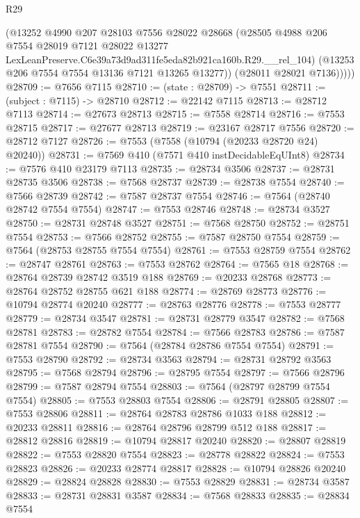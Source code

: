 \begin{lexlean}{R29}
\begin{coremodule}
            (@13252
              @4990
              @207
              @28103
              @7556
              @28022
              @28668
              (@28505
                @4988
                @206
                @7554
                @28019
                @7121
                @28022
                @13277
                LexLeanPreserve.C6e39a73d9ad311fe5eda82b921ca160b.R29.__rel_104)
              (@13253 @206 @7554 @7554 @13136 @7121 @13265 @13277))
            (@28011 @28021 @7136)))))
@28709 := @7656 @7115
@28710 := (state : @28709) -> @7551
@28711 := (subject : @7115) -> @28710
@28712 := @22142 @7115
@28713 := @28712 @7113
@28714 := @27673 @28713
@28715 := @7558 @28714
@28716 := @7553 @28715
@28717 := @27677 @28713
@28719 := @23167 @28717 @7556
@28720 := @28712 @7127
@28726 := @7553 (@7558 (@10794 (@20233 @28720 @24) @20240))
@28731 := @7569 @410 (@7571 @410 instDecidableEqUInt8)
@28734 := @7576 @410 @23179 @7113
@28735 := @28734 @3506
@28737 := @28731 @28735 @3506
@28738 := @7568 @28737
@28739 := @28738 @7554
@28740 := @7566 @28739
@28742 := @7587 @28737 @7554
@28746 := @7564 (@28740 @28742 @7554 @7554)
@28747 := @7553 @28746
@28748 := @28734 @3527
@28750 := @28731 @28748 @3527
@28751 := @7568 @28750
@28752 := @28751 @7554
@28753 := @7566 @28752
@28755 := @7587 @28750 @7554
@28759 := @7564 (@28753 @28755 @7554 @7554)
@28761 := @7553 @28759 @7554
@28762 := @28747 @28761
@28763 := @7553 @28762
@28764 := @7565 @18
@28768 := @28764 @28739 @28742 @3519 @188
@28769 := @20233 @28768
@28773 := @28764 @28752 @28755 @621 @188
@28774 := @28769 @28773
@28776 := @10794 @28774 @20240
@28777 := @28763 @28776
@28778 := @7553 @28777
@28779 := @28734 @3547
@28781 := @28731 @28779 @3547
@28782 := @7568 @28781
@28783 := @28782 @7554
@28784 := @7566 @28783
@28786 := @7587 @28781 @7554
@28790 := @7564 (@28784 @28786 @7554 @7554)
@28791 := @7553 @28790
@28792 := @28734 @3563
@28794 := @28731 @28792 @3563
@28795 := @7568 @28794
@28796 := @28795 @7554
@28797 := @7566 @28796
@28799 := @7587 @28794 @7554
@28803 := @7564 (@28797 @28799 @7554 @7554)
@28805 := @7553 @28803 @7554
@28806 := @28791 @28805
@28807 := @7553 @28806
@28811 := @28764 @28783 @28786 @1033 @188
@28812 := @20233 @28811
@28816 := @28764 @28796 @28799 @512 @188
@28817 := @28812 @28816
@28819 := @10794 @28817 @20240
@28820 := @28807 @28819
@28822 := @7553 @28820 @7554
@28823 := @28778 @28822
@28824 := @7553 @28823
@28826 := @20233 @28774 @28817
@28828 := @10794 @28826 @20240
@28829 := @28824 @28828
@28830 := @7553 @28829
@28831 := @28734 @3587
@28833 := @28731 @28831 @3587
@28834 := @7568 @28833
@28835 := @28834 @7554

\end{coremodule}
\end{lexlean}

